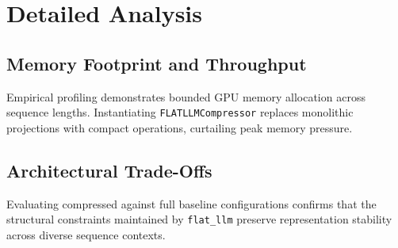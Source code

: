 \section{Detailed Analysis}

\subsection{Memory Footprint and Throughput}
Empirical profiling demonstrates bounded GPU memory allocation across sequence lengths. Instantiating \texttt{FLATLLMCompressor} replaces monolithic projections with compact operations, curtailing peak memory pressure.

\subsection{Architectural Trade-Offs}
Evaluating compressed against full baseline configurations confirms that the structural constraints maintained by \texttt{flat_llm} preserve representation stability across diverse sequence contexts.
